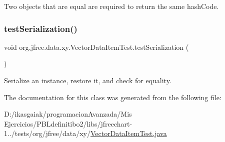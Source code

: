 Two objects that are equal are required to return the same hash\+Code. \mbox{\label{classorg_1_1jfree_1_1data_1_1xy_1_1_vector_data_item_test_a8cf4960357532b7668b1f0c51a47a0d5}} 
\subsubsection{\texorpdfstring{test\+Serialization()}{testSerialization()}}
{\footnotesize\ttfamily void org.\+jfree.\+data.\+xy.\+Vector\+Data\+Item\+Test.\+test\+Serialization (\begin{DoxyParamCaption}{ }\end{DoxyParamCaption})}

Serialize an instance, restore it, and check for equality. 

The documentation for this class was generated from the following file\+:\begin{DoxyCompactItemize}
\item 
D\+:/ikasgaiak/programacion\+Avanzada/\+Mis Ejercicios/\+P\+B\+Ldefinitibo2/libs/jfreechart-\/1../tests/org/jfree/data/xy/\mbox{\hyperlink{_vector_data_item_test_8java}{Vector\+Data\+Item\+Test.\+java}}\end{DoxyCompactItemize}
